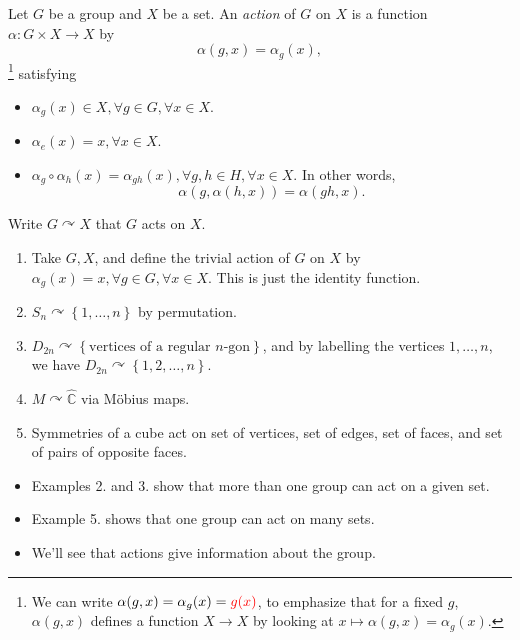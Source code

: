 \documentclass[a4paper]{article}
\newcommand{\redcomment}[1]{{\color{red}#1}}
\begin{document}
\begin{definition}
  Let $ G $ be a group and $X$ be a set. An \textit{action} of $G$ on
  $X$ is a function $ \alpha: G \times X\to X $ by
  \[
    \alpha(g,x)=\alpha_g(x)
  ,\]
  \footnote{We can write $ \alpha(g,x)
    =\alpha_g(x)=\redcomment{g(x)}$, to emphasize that for a fixed $g$,
    $ \alpha(g,x) $ defines a function $ X \to X $ by looking at $ x
  \mapsto \alpha(g,x)=\alpha_g(x) $.}
  satisfying
  \begin{itemize}
    \item $ \alpha_g(x)\in X, \forall g\in G, \forall x\in X $.
    \item $ \alpha_e(x)=x, \forall x\in X $.
    \item $ \alpha_g \circ \alpha_h(x)=\alpha_{gh}(x), \forall g,h\in
      H, \forall x\in X $. In other words,
      \[
        \alpha(g,\alpha(h,x))=\alpha(gh,x)
      .\]
  \end{itemize}
  Write $ G\curvearrowright X $ that $ G $ acts on $X$.
\end{definition}
\begin{example}
  \begin{enumerate}
    \item Take $G,X$, and define the trivial action of $G$ on $X$ by
      $ \alpha_g(x)=x, \forall g\in G, \forall x\in X $. This is just
      the identity function.
    \item $ S_n \curvearrowright \left\{ 1,\dots,n\right\} $ by permutation.
    \item $ D_{2n} \curvearrowright \left\{ \text{vertices of a
      regular $n$-gon}\right\} $, and by labelling the vertices $
      1,\dots, n $, we have $ D_{2n} \curvearrowright \left\{
      1,2,\dots,n\right\} $.
    \item $ M \curvearrowright \hat{\mathbb{C}} $ via M\"{o}bius maps.
    \item Symmetries of a cube act on set of vertices, set of edges,
      set of faces, and set of pairs of opposite faces.
  \end{enumerate}
\end{example}
\begin{remark}
  \begin{itemize}
    \item Examples 2. and 3. show that more than one group can act on
      a given set.
    \item Example 5. shows that one group can act on many sets.
    \item We'll see that actions give information about the group.
  \end{itemize}
\end{remark}
\end{document}
